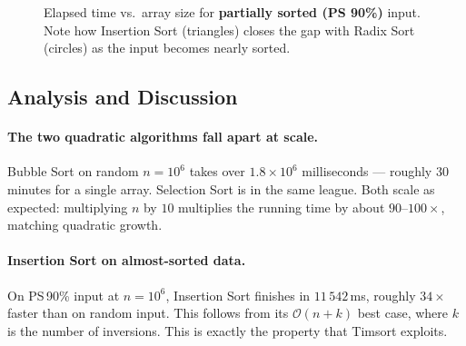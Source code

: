 \documentclass[11pt,a4paper]{article}
\begin{document}
\begin{figure}[H]
\centering
{}
\caption{Elapsed time vs.\ array size for \textbf{partially sorted (PS 90\%)} input. Note how Insertion Sort (triangles) closes the gap with Radix Sort (circles) as the input becomes nearly sorted.}
\label{fig:ps90}
\end{figure}

\subsection{Analysis and Discussion}
\label{sec:analysis}

\paragraph{The two quadratic algorithms fall apart at scale.} Bubble Sort on random $n = 10^6$ takes over $1.8 \times 10^6$ milliseconds --- roughly 30 minutes for a single array. Selection Sort is in the same league. Both scale as expected: multiplying $n$ by $10$ multiplies the running time by about $90$--$100\times$, matching quadratic growth.

\paragraph{Insertion Sort on almost-sorted data.} On PS\,90\% input at $n = 10^6$, Insertion Sort finishes in $11\,542$\,ms, roughly $34\times$ faster than on random input. This follows from its $\mathcal{O}(n + k)$ best case, where $k$ is the number of inversions. This is exactly the property that Timsort \cite{auger2019} exploits.
\end{document}
